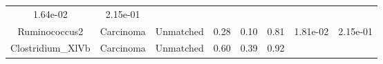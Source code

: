 \documentclass[12pt,]{article}
\begin{document}
\begin{longtable}[]{@{}cccccccc@{}}
\begin{minipage}[t]{0.06\columnwidth}
1.64e-02\strut
\end{minipage} & \begin{minipage}[t]{0.06\columnwidth}\centering\strut
2.15e-01\strut
\end{minipage}\tabularnewline
\begin{minipage}[t]{0.18\columnwidth}\centering\strut
Ruminococcus2\strut
\end{minipage} & \begin{minipage}[t]{0.07\columnwidth}\centering\strut
Carcinoma\strut
\end{minipage} & \begin{minipage}[t]{0.09\columnwidth}\centering\strut
Unmatched\strut
\end{minipage} & \begin{minipage}[t]{0.03\columnwidth}\centering\strut
0.28\strut
\end{minipage} & \begin{minipage}[t]{0.14\columnwidth}\centering\strut
0.10\strut
\end{minipage} & \begin{minipage}[t]{0.14\columnwidth}\centering\strut
0.81\strut
\end{minipage} & \begin{minipage}[t]{0.06\columnwidth}\centering\strut
1.81e-02\strut
\end{minipage} & \begin{minipage}[t]{0.06\columnwidth}\centering\strut
2.15e-01\strut
\end{minipage}\tabularnewline
\begin{minipage}[t]{0.18\columnwidth}\centering\strut
Clostridium\_XlVb\strut
\end{minipage} & \begin{minipage}[t]{0.07\columnwidth}\centering\strut
Carcinoma\strut
\end{minipage} & \begin{minipage}[t]{0.09\columnwidth}\centering\strut
Unmatched\strut
\end{minipage} & \begin{minipage}[t]{0.03\columnwidth}\centering\strut
0.60\strut
\end{minipage} & \begin{minipage}[t]{0.14\columnwidth}\centering\strut
0.39\strut
\end{minipage} & \begin{minipage}[t]{0.14\columnwidth}\centering\strut
0.92\strut
\end{minipage} & \begin{minipage}[t]{0.06\columnwidth}\centering\strut

\end{minipage}
\end{longtable}
\end{document}
